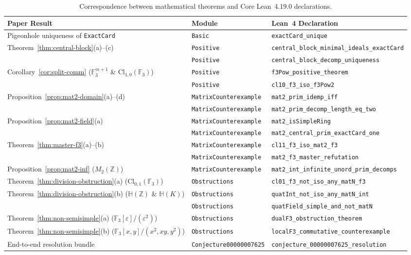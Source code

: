 \documentclass[11pt]{article}
\theoremstyle{definition}
\newcommand{\Cl}{\mathrm{Cl}}
\newcommand{\Mat}{M}
\newcommand{\F}{\mathbb{F}}
\newcommand{\Z}{\mathbb{Z}}
\newcommand{\HH}{\mathbb{H}}
\begin{document}
\begin{table}[ht]
\centering
\footnotesize
\setlength{\tabcolsep}{5pt}
\caption{Correspondence between mathematical theorems and Core Lean~4.19.0 declarations.}
\label{tab:lean-map}
\vspace{4pt}
\begin{tabular}{@{}lll@{}}
\toprule
Paper Result & Module & Lean~4 Declaration \\
\midrule
Pigeonhole uniqueness of \texttt{ExactCard} & \texttt{Basic} & \texttt{exactCard\_unique} \\
Theorem~\ref{thm:central-block}(a)--(c) & \texttt{Positive} & \texttt{central\_block\_minimal\_ideals\_exactCard} \\
 & \texttt{Positive} & \texttt{central\_block\_decomp\_uniqueness} \\
Corollary~\ref{cor:split-comm} ($\F_3^{m+1}$ \& $\Cl_{1,0}(\F_3)$) & \texttt{Positive} & \texttt{f3Pow\_positive\_theorem} \\
 & \texttt{Positive} & \texttt{cl10\_f3\_iso\_f3Pow2} \\
Proposition~\ref{prop:mat2-domain}(a)--(d) & \texttt{MatrixCounterexample} & \texttt{mat2\_prim\_idemp\_iff} \\
 & \texttt{MatrixCounterexample} & \texttt{mat2\_prim\_decomp\_length\_eq\_two} \\
Proposition~\ref{prop:mat2-field}(a) & \texttt{MatrixCounterexample} & \texttt{mat2\_isSimpleRing} \\
 & \texttt{MatrixCounterexample} & \texttt{mat2\_central\_prim\_exactCard\_one} \\
Theorem~\ref{thm:master-f3}(a)--(b) & \texttt{MatrixCounterexample} & \texttt{cl11\_f3\_iso\_mat2\_f3} \\
 & \texttt{MatrixCounterexample} & \texttt{mat2\_f3\_master\_refutation} \\
Proposition~\ref{prop:mat2-inf} ($\Mat_2(\Z)$) & \texttt{MatrixCounterexample} & \texttt{mat2\_int\_infinite\_unord\_prim\_decomps} \\
Theorem~\ref{thm:division-obstruction}(a) ($\Cl_{0,1}(\F_3)$) & \texttt{Obstructions} & \texttt{cl01\_f3\_not\_iso\_any\_matN\_f3} \\
Theorem~\ref{thm:division-obstruction}(b) ($\HH(\Z)$ \& $\HH(K)$) & \texttt{Obstructions} & \texttt{quatInt\_not\_iso\_any\_matN\_int} \\
 & \texttt{Obstructions} & \texttt{quatField\_simple\_and\_not\_matN} \\
Theorem~\ref{thm:non-semisimple}(a) ($\F_3[\varepsilon]/(\varepsilon^2)$) & \texttt{Obstructions} & \texttt{dualF3\_obstruction\_theorem} \\
Theorem~\ref{thm:non-semisimple}(b) ($\F_3[x,y]/(x^2,xy,y^2)$) & \texttt{Obstructions} & \texttt{localF3\_commutative\_counterexample} \\
End-to-end resolution bundle & \texttt{Conjecture00000007625} & \texttt{conjecture\_00000007625\_resolution} \\
\bottomrule
\end{tabular}
\end{table}
\end{document}
